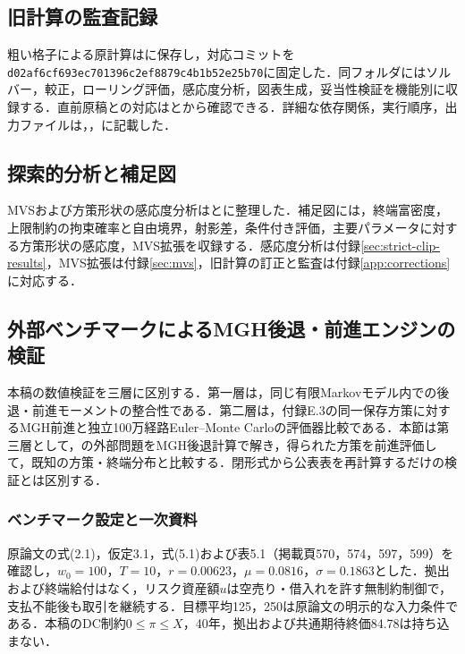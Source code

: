 \documentclass[10pt,a4paper]{article}
\theoremstyle{plain}
\theoremstyle{definition}
\begin{document}
\subsection{旧計算の監査記録}
粗い格子による原計算はに保存し，対応コミットを\texttt{d02af6cf693ec701396c2ef8879c4b1b52e25b70}に固定した．同フォルダにはソルバー，較正，ローリング評価，感応度分析，図表生成，妥当性検証を機能別に収録する．直前原稿との対応はとから確認できる．詳細な依存関係，実行順序，出力ファイルは，，に記載した．

\subsection{探索的分析と補足図}
MVSおよび方策形状の感応度分析はとに整理した．補足図には，終端富密度，上限制約の拘束確率と自由境界，射影差，条件付き評価，主要パラメータに対する方策形状の感応度，MVS拡張を収録する．感応度分析は付録\ref{sec:strict-clip-results}，MVS拡張は付録\ref{sec:mvs}，旧計算の訂正と監査は付録\ref{app:corrections}に対応する．

\subsection{外部ベンチマークによるMGH後退・前進エンジンの検証}
\label{app:four-model-validation}

本稿の数値検証を三層に区別する．第一層は，同じ有限Markovモデル内での後退・前進モーメントの整合性である．第二層は，付録E.3の同一保存方策に対するMGH前進と独立100万経路Euler--Monte Carloの評価器比較である．本節は第三層として，\citet{vanStadenDangForsyth2021}の外部問題をMGH後退計算で解き，得られた方策を前進評価して，既知の方策・終端分布と比較する．閉形式から公表表を再計算するだけの検証とは区別する．

\subsubsection{ベンチマーク設定と一次資料}

原論文の式(2.1)，仮定3.1，式(5.1)および表5.1（掲載頁570，574，597，599）を確認し，$w_0=100$，$T=10$，$r=0.00623$，$\mu=0.0816$，$\sigma=0.1863$とした．拠出および終端給付はなく，リスク資産額$u$は空売り・借入れを許す無制約制御で，支払不能後も取引を継続する．目標平均125，250は原論文の明示的な入力条件である．本稿のDC制約$0\leq\pi\leq X$，40年，拠出および共通期待終価84.78は持ち込まない．
\end{document}
